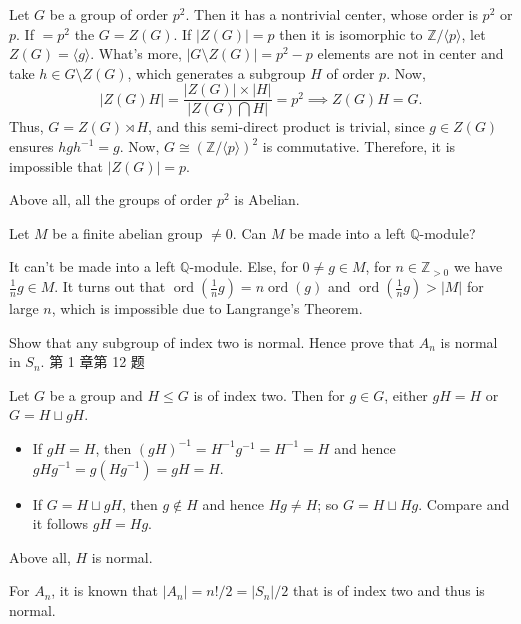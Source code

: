 \begin{solution}
    Let $G$ be a group of order $p^{2}$. Then it has a nontrivial center, whose order is $p^{2}$ or $p$. 
    If $=p^{2}$ the $G=Z(G)$. 
    If $|Z(G)|=p$ then it is isomorphic to $\mathbb{Z}/\langle p \rangle $, let $Z(G)=\langle g \rangle$. 
    What's more, $|G\setminus Z(G)|=p^{2}-p$ elements are not in center and take $h\in G\setminus Z(G)$, which generates a subgroup $H$ of order $p$. 
    Now, 
        \[
            |Z(G) H|=\frac{|Z(G)|\times|H|}{|Z(G)\bigcap H|}=p^{2}\implies Z(G)H=G.
        \]
    Thus, $G=Z(G)\rtimes H$, and this semi-direct product is trivial, since $g\in Z(G)$ ensures $h g h^{-1}=g$. 
    Now, $G\cong (\mathbb{Z}/\langle p \rangle)^{2} $ is commutative. Therefore, it is impossible that $|Z(G)|=p$.
    \par Above all, all the groups of order $p^{2}$ is Abelian.
\end{solution}
\setcounter{pb}{8}
\begin{problem}
    Let $M $ be a finite abelian group $\neq 0$. Can $M $ be made into a left $\mathbb{Q}$-module?
\end{problem}

\begin{solution}
    It can't be made into a left $\mathbb{Q}$-module. Else, for $0\neq g\in M$, for $n\in\mathbb{Z}_{>0}$ we have $\frac{1}{n}g\in M$. 
    It turns out that $\operatorname{ord}(\frac{1}{n}g)=n \operatorname{ord}(g)$ and $\operatorname{ord}(\frac{1}{n}g)>|M|$ for large $n$, 
    which is impossible due to Langrange's Theorem.
\end{solution}


\setcounter{pb}{11}

\begin{problem}
    Show that any subgroup of index two is normal. Hence prove that
    $A_n$ is normal in $S_n$. 第 1 章第 12 题
\end{problem}

\begin{solution}
    Let $G$ be a group and $H\leq G$ is of index two. Then for $g\in G$, either $ g H=H$ or $G=H\sqcup g H$. 
    \begin{itemize}
        \item If $g H=H$, then $(g H)^{-1}=H^{-1} g^{-1}=H^{-1}=H$ and hence $g H g^{-1}=g (H g^{-1})=g H=H$.
        \item If $G=H\sqcup g H$, then $g\notin H$ and hence $H g\neq H$; so $G=H\sqcup H g$. Compare and it follows $g H =H g$.
    \end{itemize}
    Above all, $H$ is normal.
    \par For $A_{n}$, it is known that $|A_{n}|=n!/2=|S_{n}|/2$ that is of index two and thus is normal.
\end{solution}

